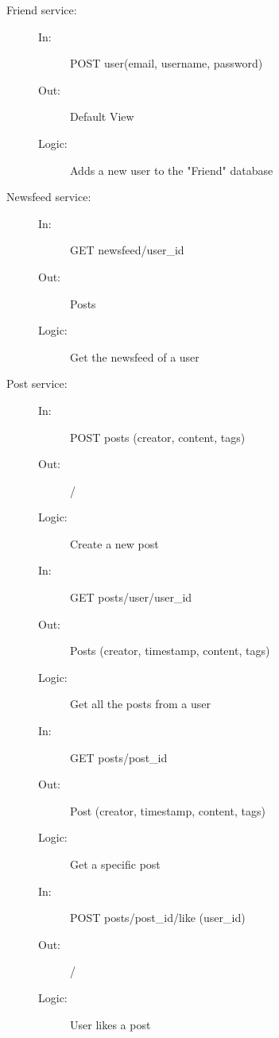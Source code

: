 \documentclass{article}
\begin{document}
\begin{description}
    \item [Friend service:] 
    \begin{description}
        \item[]
        \item[In:] POST user(email, username, password)
        \item[Out:] Default View
        \item[Logic:] Adds a new user to the "Friend" database
        \item[]
    \end{description}
\end{description}

\begin{description}
    \item [Newsfeed service:] 
    \begin{description}
        \item[]
        \item[In:] GET newsfeed/user\_id
        \item[Out:] Posts
        \item[Logic:] Get the newsfeed of a user
    \end{description}
\end{description}

\begin{description}
    \item [Post service:] 
    \begin{description}
        \item[]
        \item[In:] POST posts (creator, content, tags)
        \item[Out:] /
        \item[Logic:] Create a new post
        \item[]

        \item[In:] GET posts/user/user\_id
        \item[Out:] Posts (creator, timestamp, content, tags)
        \item[Logic:] Get all the posts from a user
        \item[]

        \item[In:] GET posts/post\_id
        \item[Out:] Post (creator, timestamp, content, tags)
        \item[Logic:] Get a specific post
        \item[]
        
        \item[In:] POST posts/post\_id/like (user\_id)
        \item[Out:] /
        \item[Logic: ] User likes a post
    \end{description}
\end{description}
\end{document}
